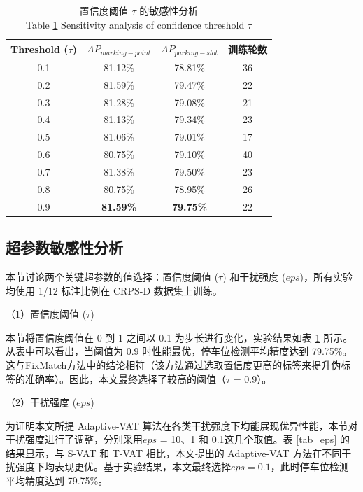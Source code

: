 \begin{table}[!h]
\centering
\setlength{\tabcolsep}{8mm}
\caption{置信度阈值 $\tau$ 的敏感性分析 \\ Table \ref{tab_confidence} Sensitivity analysis of confidence threshold $\tau$}
    \begin{tabular}{cccc}
    \toprule
    Threshold ($\tau$) & $AP_{marking-point}$ & $AP_{parking-slot}$ & 训练轮数\\
    \midrule
    0.1 & 81.12\% & 78.81\%	& 36 \\
    0.2	& 81.59\%	& 79.47\%	& 22 \\
    0.3	& 81.28\%	& 79.08\%	& 21 \\
    0.4	& 81.13\%	& 79.34\%	& 23 \\
    0.5	& 81.06\%	& 79.01\%	& 17 \\
    0.6 & 80.75\%	& 79.10\%	& 40 \\
    0.7	& 81.38\%	& 79.50\%	& 23 \\
    0.8	& 80.75\%	& 78.95\%	& 26 \\
    0.9	& \textbf{81.59\%}	& \textbf{79.75\%}	& 22 \\
    \bottomrule
    \end{tabular}
\label{tab_confidence}
\end{table} 

\subsection{超参数敏感性分析}

本节讨论两个关键超参数的值选择：置信度阈值 ($\tau$) 和干扰强度 ($eps$)，所有实验均使用 1/12 标注比例在 CRPS-D 数据集上训练。

（1）置信度阈值 ($\tau$)

本节将置信度阈值在 0 到 1 之间以 0.1 为步长进行变化，实验结果如表 \ref{tab_confidence} 所示。从表中可以看出，当阈值为 0.9 时性能最优，停车位检测平均精度达到 79.75\%。这与FixMatch\cite{sohn2020fixmatch}方法中的结论相符（该方法通过选取置信度更高的标签来提升伪标签的准确率）。因此，本文最终选择了较高的阈值（$\tau$ = 0.9）。

（2）干扰强度 ($eps$)

为证明本文所提 Adaptive-VAT 算法在各类干扰强度下均能展现优异性能，本节对干扰强度进行了调整，分别采用\(eps\) = 10、1 和 0.1这几个取值。表 \ref{tab_eps} 的结果显示，与 S-VAT 和 T-VAT 相比，本文提出的 Adaptive-VAT 方法在不同干扰强度下均表现更优。基于实验结果，本文最终选择$eps = 0.1$，此时停车位检测平均精度达到 79.75\%。

